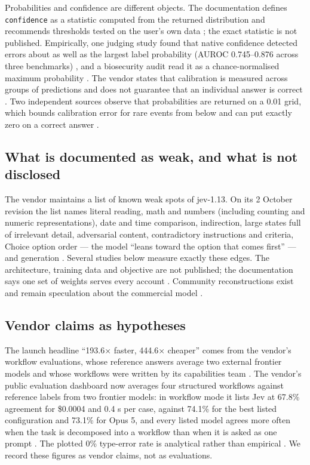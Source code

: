 Probabilities and confidence are different objects. The documentation defines \texttt{confidence} as a statistic computed from the returned distribution and recommends thresholds tested on the user's own data \citep{typesafe2026confidence}; the exact statistic is not published. Empirically, one judging study found that native confidence detected errors about as well as the largest label probability (AUROC 0.745–0.876 across three benchmarks) \citep{arxiv2609_26550}, and a biosecurity audit read it as a chance-normalised maximum probability \citep{arxiv2609_30454}. The vendor states that calibration is measured across groups of predictions and does not guarantee that an individual answer is correct \citep{typesafe2026systemone}. Two independent sources observe that probabilities are returned on a 0.01 grid, which bounds calibration error for rare events from below and can put exactly zero on a correct answer \citep{arxiv2609_24052,gh_scienthoon_jev_ood_calibration}.

\subsection{What is documented as weak, and what is not disclosed}

The vendor maintains a list of known weak spots of jev-1.13. On its 2 October revision the list names literal reading, math and numbers (including counting and numeric representations), date and time comparison, indirection, large states full of irrelevant detail, adversarial content, contradictory instructions and criteria, Choice option order — the model “leans toward the option that comes first” — and generation \citep{typesafe2026jaggedness}. Several studies below measure exactly these edges. The architecture, training data and objective are not published; the documentation says one set of weights serves every account \citep{typesafe2026models}. Community reconstructions exist and remain speculation about the commercial model \citep{gh_jaredpalmer_kev}.

\subsection{Vendor claims as hypotheses}

The launch headline “193.6× faster, 444.6× cheaper” comes from the vendor's workflow evaluations, whose reference answers average two external frontier models and whose workflows were written by its capabilities team \citep{typesafe2026launch}. The vendor's public evaluation dashboard now averages four structured workflows against reference labels from two frontier models: in workflow mode it lists Jev at 67.8\% agreement for \$0.0004 and 0.4 s per case, against 74.1\% for the best listed configuration and 73.1\% for Opus 5, and every listed model agrees more often when the task is decomposed into a workflow than when it is asked as one prompt \citep{typesafe2026evals}. The plotted 0\% type-error rate is analytical rather than empirical \citep{typesafe2026launch}. We record these figures as vendor claims, not as evaluations.

